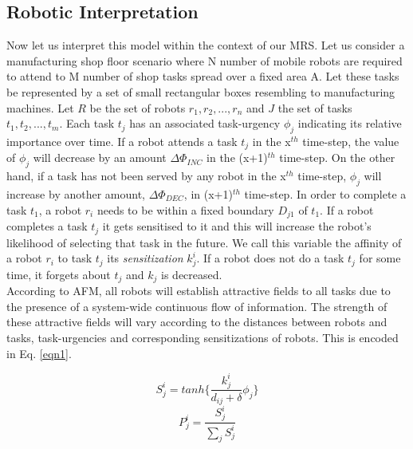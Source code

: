 \documentclass{llncs}
\begin{document}
\subsection{Robotic Interpretation}
Now let us interpret this model within the context of our MRS. Let us consider a manufacturing shop floor scenario where N number of mobile robots are required to attend to M number of shop tasks spread over a fixed area A.
Let these tasks be represented by a set of small rectangular boxes resembling to manufacturing machines.
Let $R$ be the set of robots ${r_1, r_2,...,r_n}$ and $J$ the set of tasks ${t_1, t_2,...,t_m}$.
Each task $t_j$ has an associated task-urgency $\phi_j$ indicating its relative importance over time.
If a robot attends a task $t_j$ in the x$^{th}$ time-step, the value of $\phi_j$ will decrease by an amount $\Delta \Phi_{INC} $ in the (x+1)$^{th}$ time-step.
On the other hand, if a task has not been served by any robot in the x$^{th}$ time-step, $\phi_j$ will increase by another amount, $\Delta \Phi_{DEC} $, in (x+1)$^{th}$ time-step.
In order to complete a task $t_1$, a robot $r_i$ needs to be within a fixed boundary $D_{j1}$ of $t_1$.
If a robot completes a task $t_j$ it gets sensitised to it and this will increase the robot's likelihood of selecting that task in the future.
We call this variable the affinity of a robot $r_i$ to task $t_j$ its {\em sensitization} $k_{j}^{i}$.
If a robot does not do a task $t_j$ for some time, it forgets about $t_j$ and $k_j$ is decreased.\\
According to AFM, all robots will establish attractive fields to all tasks due to the presence of a system-wide continuous flow of information.
The strength of these attractive fields will vary according to the distances between robots and tasks, task-urgencies and corresponding sensitizations of robots. This is encoded in Eq. \ref{eqn1}.
\begin{small}
\begin{multicols}{2}
\begin{equation}
S_{j}^{i} = tanh\{\frac{k_{j}^{i}}{d_{ij}+\delta } \phi _{j}\}
\label{eqn1}
\end{equation}
\vspace*{0.25cm}
\begin{equation}
P_{j}^{i} = \frac{S_{j}^{i}}{\sum_{j}^{}S_{j}^{i}}
\label{eqn2}
\end{equation}
\end{multicols}
\end{small}
\end{document}
